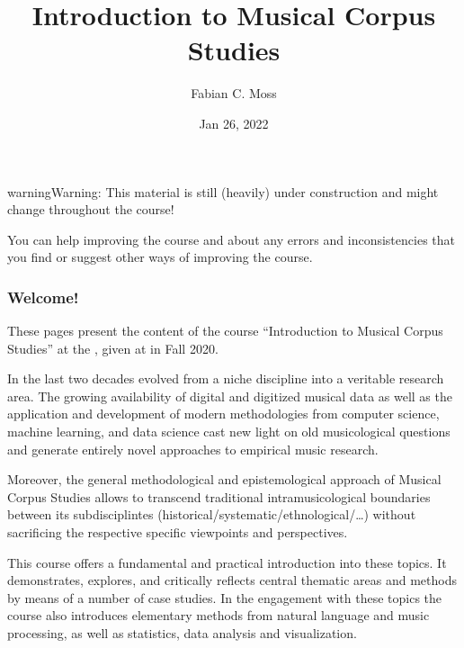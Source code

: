 \documentclass[letterpaper,10pt,english]{sphinxmanual}
\title{Introduction to Musical Corpus Studies}
\date{Jan 26, 2022}
\author{Fabian C.\@{} Moss}
\begin{document}
\pagestyle{empty}
\sphinxmaketitle
\pagestyle{plain}
\sphinxtableofcontents
\pagestyle{normal}
\label{\detokenize{index::doc}}



\begin{sphinxadmonition}{warning}{Warning:}
\sphinxAtStartPar
This material is still (heavily) under construction and might change throughout the course!

\sphinxAtStartPar
You can help improving the course and  about any errors and inconsistencies that you find
or suggest other ways of improving the course.
\end{sphinxadmonition}
\subsubsection*{Welcome!}

\sphinxAtStartPar
These pages present the content of the course “Introduction to Musical Corpus Studies” at the ,
given at  in Fall 2020.

\sphinxAtStartPar
In the last two decades  evolved from a niche discipline into a veritable research area.
The growing availability of digital and digitized musical data as well as the application and development of modern
methodologies from computer science, machine learning, and data science cast new light on old musicological questions
and generate entirely novel approaches to empirical music research.

\sphinxAtStartPar
Moreover, the general methodological and epistemological approach of Musical Corpus Studies allows to transcend traditional
intra\sphinxhyphen{}musicological boundaries between its sub\sphinxhyphen{}disciplintes (historical/systematic/ethnological/…) without sacrificing the
respective specific viewpoints and perspectives.

\sphinxAtStartPar
This course offers a fundamental and practical introduction into these topics.
It demonstrates, explores, and critically reflects central thematic areas and methods by means of a number of case studies.
In the engagement with these topics the course also introduces elementary methods from natural language and music processing,
as well as statistics, data analysis and visualization.
\end{document}
